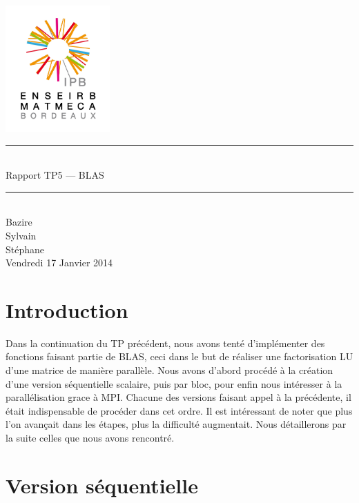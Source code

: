 \documentclass[a4paper,11pt]{article}
\begin{document}
\begin{titlepage}
  \begin{center}

    \begin{center}
      \includegraphics[width=4cm]{EM.jpg}
    \end{center}

    \vspace*{1cm}
        
    \rule{0.75\linewidth}{0.7mm}\\[0.4cm]
    {\Huge Rapport TP5 --- BLAS\\[0.4cm]}
    \rule{0.75\linewidth}{0.7mm} \\[1.5cm]

    {\Large Bazire \\Sylvain {}\\Stéphane \\[2cm]}
    {\Large Vendredi 17 Janvier 2014}
  \end{center}
\end{titlepage}

\tableofcontents
\clearpage
\section{Introduction}

Dans la continuation du TP précédent, nous avons tenté d'implémenter des fonctions faisant partie de BLAS, ceci dans le but de réaliser une factorisation LU d'une matrice de manière parallèle. Nous avons d'abord procédé à la création d'une version séquentielle scalaire, puis par bloc, pour enfin nous intéresser à la parallélisation grace à MPI. Chacune des versions faisant appel à la précédente, il était indispensable de procéder dans cet ordre. Il est intéressant de noter que plus l'on avançait dans les étapes, plus la difficulté augmentait. Nous détaillerons par la suite celles que nous avons rencontré.

\section{Version séquentielle}
\end{document}
